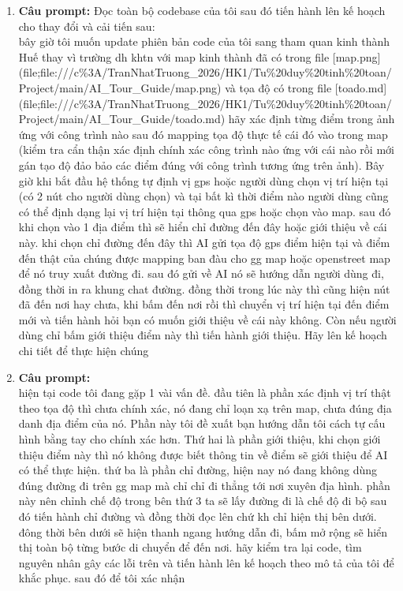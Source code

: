 \begin{enumerate}
\item \textbf{Câu prompt:} Đọc toàn bộ codebase của tôi sau đó tiến hành lên kế hoạch cho thay đổi và cải tiến sau: \\
bây giờ tôi muốn update phiên bản code của tôi sang tham quan kinh thành Huế thay vì trường dh khtn với map kinh thành đã có trong file [map.png](file;file:///c\%3A/TranNhatTruong\_2026/HK1/Tu\%20duy\%20tinh\%20toan/Project/main/AI\_Tour\_Guide/map.png)  và tọa độ có trong file [toado.md](file;file:///c\%3A/TranNhatTruong\_2026/HK1/Tu\%20duy\%20tinh\%20toan/Project/main/AI\_Tour\_Guide/toado.md) hãy xác định từng điểm trong ảnh ứng với công trình nào sau đó mapping tọa độ thực tế cái đó vào trong map (kiểm tra cẩn thận xác định chính xác công trình nào ứng với cái nào rồi mới gán tạo độ đảo bảo các điểm đúng với công trình tương ứng trên ảnh). Bây giờ khi bắt đầu hệ thống tự định vị gps hoặc người dùng chọn vị trí hiện tại (có 2 nút cho người dùng chọn) và tại bất kì thời điểm nào người dùng cũng có thể định dạng lại vị trí hiện tại thông qua gps hoặc chọn vào map. sau đó khi chọn vào 1 địa điểm thì sẽ hiển chỉ đường đến đây hoặc giới thiệu về cái này. khi chọn chỉ đường đến đây thì AI gửi tọa độ gps điểm hiện tại và điểm đến thật của chúng được mapping ban đàu cho gg map hoặc openstreet map để nó truy xuất đường đi. sau đó gửi về AI nó sẽ hướng dẫn người dùng đi, đồng thời in ra khung chat đường. đồng thời trong lúc này thì cũng hiện nút đã đến nơi hay chưa, khi bấm đến nơi rồi thì chuyển vị trí hiện tại đến điểm mới và tiến hành hỏi bạn có muốn giới thiệu về cái này không. Còn nếu người dùng chỉ bấm giới thiệu điểm này thì tiến hành giới thiệu. Hãy lên kế hoạch chi tiết để thực hiện chúng \\


\item \textbf{Câu prompt:} \\
\* hiện tại code tôi đang gặp 1 vài vấn đề. đầu tiên là phần xác định vị trí thật theo tọa độ thì chưa chính xác, nó đang chỉ loạn xạ trên map, chưa đúng địa danh địa điểm của nó. Phần này tôi đề xuất bạn hướng dẫn tôi cách tự cấu hình bằng tay cho chính xác hơn. Thứ hai là phần giới thiệu, khi chọn giới thiệu điểm này thì nó không được biết thông tin về điểm sẽ giới thiệu để AI có thể thực hiện. thứ ba là phần chỉ đường, hiện nay nó đang không dùng đúng đường đi trên gg map mà chỉ chỉ đi thẳng tới nơi xuyên địa hình. phần này nên chỉnh chế độ trong bên thứ 3 ta sẽ lấy đường đi là chế độ đi bộ sau đó tiến hành chỉ đường và đồng thời đọc lên chứ kh chỉ hiện thị bên dưới. đông thời bên dưới sẽ hiện thanh ngang hướng dẫn đi, bấm mở rộng sẽ hiển thị toàn bộ từng bước di chuyển để đến nơi. hãy kiểm tra lại code, tìm nguyên nhân gây các lỗi trên và tiến hành lên kế hoạch theo mô tả của tôi để khắc phục. sau đó để tôi xác nhận \\




\end{enumerate}
